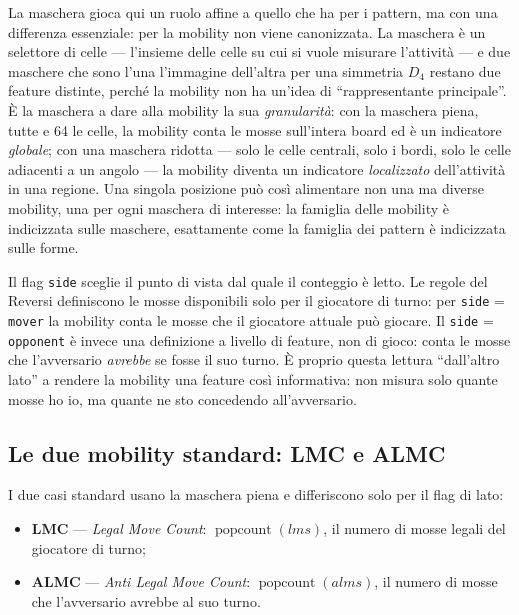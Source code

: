 La maschera gioca qui un ruolo affine a quello che ha per i pattern, ma con una
differenza essenziale: per la mobility non viene canonizzata. La maschera è un
selettore di celle --- l'insieme delle celle su cui si vuole misurare
l'attività --- e due maschere che sono l'una l'immagine dell'altra per una simmetria
$D_4$ restano due feature distinte, perché la mobility non ha un'idea di
``rappresentante principale''. È la maschera a dare alla mobility la sua
\textit{granularità}: con la maschera piena, tutte e 64 le celle, la mobility conta
le mosse sull'intera board ed è un indicatore \textit{globale}; con una maschera
ridotta --- solo le celle centrali, solo i bordi, solo le celle adiacenti a un
angolo --- la mobility diventa un indicatore \textit{localizzato} dell'attività in una
regione. Una singola posizione può così alimentare non una ma diverse mobility, una per
ogni maschera di interesse: la famiglia delle mobility è indicizzata sulle maschere,
esattamente come la famiglia dei pattern è indicizzata sulle forme.

Il flag \texttt{side} sceglie il punto di vista dal quale il conteggio è letto. Le
regole del Reversi definiscono le mosse disponibili solo per il giocatore di turno: per
\texttt{side} = \texttt{mover} la mobility conta le mosse che il giocatore attuale può
giocare. Il \texttt{side} = \texttt{opponent} è invece una definizione a livello di
feature, non di gioco: conta le mosse che l'avversario \textit{avrebbe} se fosse il suo
turno. È proprio questa lettura ``dall'altro lato'' a rendere la mobility una feature
così informativa: non misura solo quante mosse ho io, ma quante ne sto concedendo
all'avversario.

\subsection{Le due mobility standard: LMC e ALMC}

I due casi standard usano la maschera piena e differiscono solo per il flag di
lato:

\begin{itemize}
    \item \textbf{LMC} --- \textit{Legal Move Count}: $\operatorname{popcount}(lms)$,
          il numero di mosse legali del giocatore di turno;
    \item \textbf{ALMC} --- \textit{Anti Legal Move Count}:
          $\operatorname{popcount}(alms)$, il numero di mosse che l'avversario avrebbe
          al suo turno.
\end{itemize}

